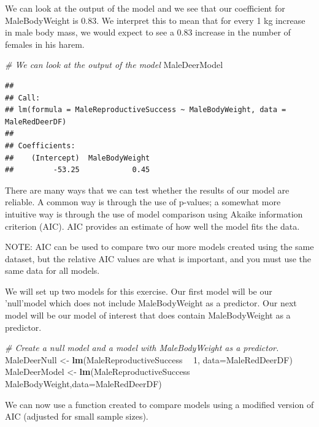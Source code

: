 \documentclass[]{book}
\newenvironment{Shaded}{\begin{snugshade}}{\end{snugshade}}
\newcommand{\CommentTok}[1]{\textcolor[rgb]{0.56,0.35,0.01}{\textit{#1}}}
\newcommand{\DataTypeTok}[1]{\textcolor[rgb]{0.13,0.29,0.53}{#1}}
\newcommand{\DecValTok}[1]{\textcolor[rgb]{0.00,0.00,0.81}{#1}}
\newcommand{\KeywordTok}[1]{\textcolor[rgb]{0.13,0.29,0.53}{\textbf{#1}}}
\newcommand{\NormalTok}[1]{#1}
\newcommand{\OperatorTok}[1]{\textcolor[rgb]{0.81,0.36,0.00}{\textbf{#1}}}
\newcommand{\StringTok}[1]{\textcolor[rgb]{0.31,0.60,0.02}{#1}}
\begin{document}
We can look at the output of the model and we see that our coefficient for MaleBodyWeight is 0.83. We interpret this to mean that for every 1 kg increase in male body mass, we would expect to see a 0.83 increase in the number of females in his harem.

\begin{Shaded}
\begin{Highlighting}[]
\CommentTok{# We can look at the output of the model  }
\NormalTok{MaleDeerModel}
\end{Highlighting}
\end{Shaded}

\begin{verbatim}
## 
## Call:
## lm(formula = MaleReproductiveSuccess ~ MaleBodyWeight, data = MaleRedDeerDF)
## 
## Coefficients:
##    (Intercept)  MaleBodyWeight  
##         -53.25            0.45
\end{verbatim}

There are many ways that we can test whether the results of our model are reliable. A common way is through the use of p-values; a somewhat more intuitive way is through the use of model comparison using Akaike information criterion (AIC). AIC provides an estimate of how well the model fits the data.

NOTE: AIC can be used to compare two our more models created using the same dataset, but the relative AIC values are what is important, and you must use the same data for all models.

We will set up two models for this exercise. Our first model will be our 'null'model which does not include MaleBodyWeight as a predictor. Our next model will be our model of interest that does contain MaleBodyWeight as a predictor.

\begin{Shaded}
\begin{Highlighting}[]
\CommentTok{# Create a null model and a model with MaleBodyWeight as a predictor.}
\NormalTok{MaleDeerNull <-}\StringTok{ }\KeywordTok{lm}\NormalTok{(MaleReproductiveSuccess }\OperatorTok{~}\StringTok{ }\DecValTok{1}\NormalTok{, }\DataTypeTok{data=}\NormalTok{MaleRedDeerDF)}
\NormalTok{MaleDeerModel <-}\StringTok{ }\KeywordTok{lm}\NormalTok{(MaleReproductiveSuccess }\OperatorTok{~}\StringTok{ }\NormalTok{MaleBodyWeight,}\DataTypeTok{data=}\NormalTok{MaleRedDeerDF)}
\end{Highlighting}
\end{Shaded}

We can now use a function created to compare models using a modified version of AIC (adjusted for small sample sizes).
\end{document}
